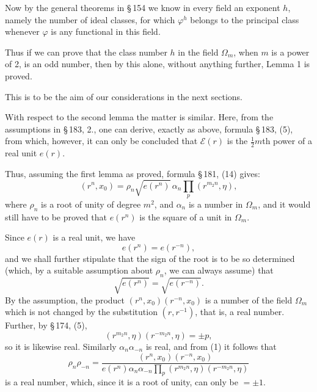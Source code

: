 \documentclass[11pt]{article}
\begin{document}
Now by the general theorems in \S\,154 we know in every field an exponent $h$, namely the number of ideal classes, for which $\varphi^h$ belongs to the principal class whenever $\varphi$ is any functional in this field.

Thus if we can prove that the class number $h$ in the field $\Omega_m$, when $m$ is a power of 2, is an odd number, then by this alone, without anything further, Lemma 1 is proved.

This is to be the aim of our considerations in the next sections.

With respect to the second lemma the matter is similar. Here, from the assumptions in \S\,183, 2., one can derive, exactly as above, formula \S\,183, (5), from which, however, it can only be concluded that $\mathscr E(r)$ is the $\frac12m$th power of a real unit $e(r)$.

Thus, assuming the first lemma as proved, formula \S\,181, (14) gives:
\begin{equation}
(r^n,x_0)=\rho_n\sqrt{e(r^n)}\,\alpha_n\prod_p (r^{m_2n},\eta),
\tag{1}
\end{equation}
where $\rho_n$ is a root of unity of degree $m^2$, and $\alpha_n$ is a number in $\Omega_m$, and it would still have to be proved that $e(r^n)$ is the square of a unit in $\Omega_m$.

Since $e(r)$ is a real unit, we have
\begin{equation}
e(r^n)=e(r^{-n}),
\tag{2}
\end{equation}
and we shall further stipulate that the sign of the root is to be so determined (which, by a suitable assumption about $\rho_n$, we can always assume) that
\begin{equation}
\sqrt{e(r^n)}=\sqrt{e(r^{-n})}.
\tag{3}
\end{equation}
By the assumption, the product $(r^n,x_0)(r^{-n},x_0)$ is a number of the field $\Omega_m$ which is not changed by the substitution $(r,r^{-1})$, that is, a real number. Further, by \S\,174, (5),
\[
(r^{m_2n},\eta)(r^{-m_2n},\eta)=\pm p,
\]
so it is likewise real. Similarly $\alpha_n\alpha_{-n}$ is real, and from (1) it follows that
\[
\rho_n\rho_{-n}=\frac{(r^n,x_0)(r^{-n},x_0)}{e(r^n)\alpha_n\alpha_{-n}\prod_p (r^{m_2n},\eta)(r^{-m_2n},\eta)}
\]
is a real number, which, since it is a root of unity, can only be $=\pm1$.
\end{document}
